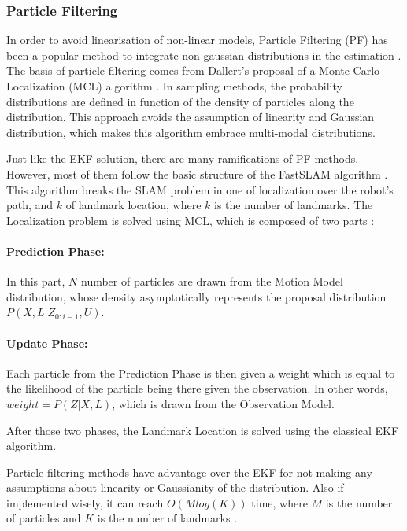 \documentclass[12pt]{article}
\begin{document}
	\subsubsection{Particle Filtering}

In order to avoid linearisation of non-linear models, Particle Filtering (PF) has been a popular method to integrate non-gaussian distributions in the estimation \cite{Montemerlo02fastslam:a}\cite{772544}. The basis of particle filtering comes from Dallert's proposal of a Monte Carlo Localization (MCL) algorithm \cite{772544}. In sampling methods, the probability distributions are defined in function of the density of particles along the distribution. This approach avoids the assumption of linearity and Gaussian distribution, which makes this algorithm embrace multi-modal distributions.
	
Just like the EKF solution, there are many ramifications of PF methods. However, most of them follow the basic structure of the FastSLAM algorithm \cite{Montemerlo02fastslam:a}. This algorithm breaks the SLAM problem in one of localization over the robot's path, and $k$ of landmark location, where $k$ is the number of landmarks. The Localization problem is solved using MCL, which is composed of two parts \cite{772544}:
	 
\paragraph{Prediction Phase:} In this part, $N$ number of particles are drawn from the Motion Model distribution, whose density asymptotically represents the proposal distribution $P(X, L | Z_{0:i-1}, U)$.
	 
\paragraph{Update Phase:} Each particle from the Prediction Phase is then given a weight which is equal to the likelihood of the particle being there given the observation. In other words, $weight = P(Z|X, L)$, which is drawn from the Observation Model.
	 
After those two phases, the Landmark Location is solved using the classical EKF algorithm.
	 
Particle filtering methods have advantage over the EKF for not making any assumptions about linearity or Gaussianity of the distribution. Also if implemented wisely, it can reach $O(Mlog(K))$ time, where $M$ is the number of particles and $K$ is the number of landmarks \cite{Montemerlo02fastslam:a}.
	 
\end{document}
